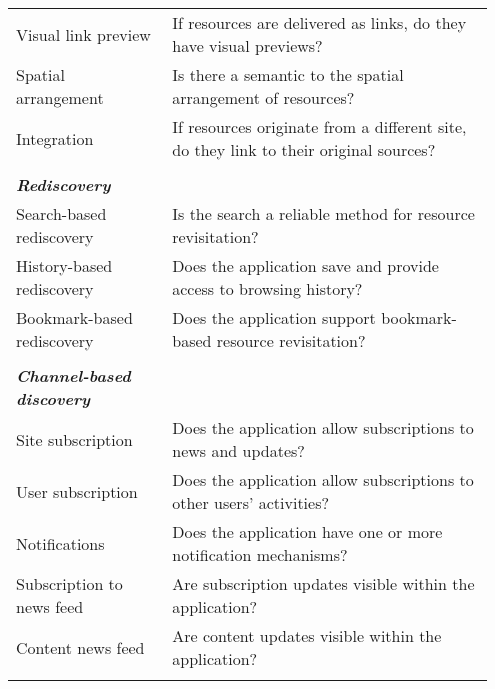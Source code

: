 \begin{table*}[ht!]
\begin{tabular}{|p{0.31\linewidth}|p{0.64\linewidth}|}
Visual link preview               & If resources are delivered as links, do they have visual previews?                                                                        \\
Spatial arrangement          & Is there a semantic to the spatial arrangement of resources?                                                    \\
Integration                  & If resources originate from a different site, do they link to their original sources?                   \\
&\\
\emph{\textbf{Rediscovery}}                     &                                                                                                           \\
Search-based rediscovery     & Is the search a reliable method for resource revisitation?                             \\
History-based rediscovery    & Does the application save and provide access to browsing history?                                        \\
Bookmark-based rediscovery   & Does the application support bookmark-based resource revisitation?                                        \\
&\\

\emph{\textbf{Channel-based discovery}}          &                                                                                                           \\
Site subscription            & Does the application allow subscriptions to news and updates?                                             \\
User subscription             & Does the application allow subscriptions to other users' activities?                                      \\
Notifications                & Does the application have one or more notification mechanisms?                                                      \\
Subscription to news feed                  & Are subscription updates visible within the application?  \\
Content news feed                  & Are content updates visible within the application? \\
&\\
\hline     

         
\end{tabular}
\end{table*}


